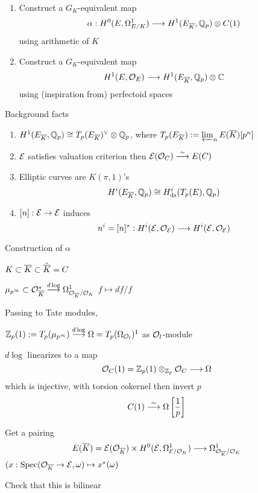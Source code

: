 \begin{enumerate}[1.]
\item Construct a $G_K$-equivalent map 
	\[
	\alpha: H^0(E, \Omega_{E/K}^1) \stackrel{}{\longrightarrow} H^1(E_{\overline{K}}, \mathbb{Q}_p) \otimes C(1)
	\]
using arithmetic of $K$

\item Construct a $G_K$-equivalent map
	\[
	H^1(E,\mathcal{O}_E) \stackrel{}{\longrightarrow} H^1(E_{\overline{K}}, \mathbb{Q}_p) \otimes \mathbb{C}
	\]
using (inspiration from) perfectoid spaces
\end{enumerate}


Background facts

\begin{enumerate}[1.]
\item $H^1(E_{\overline{K}}, \mathbb{Q}_p) \cong T_p(E_{\overline{K}})^\vee \otimes \mathbb{Q}_p$, where $T_p(E_{\overline{K}}):= \varprojlim_n E(\overline{K})[p^n]$

\item $\mathcal{E}$ satisfies valuation criterion then $\mathcal{E}(\mathcal{O}_C) \stackrel{\sim}{\longrightarrow} E(C)$

\item Elliptic curves are $K(\pi,1)$'s
	\[
	H^i(E_{\overline{K}}, \mathbb{Q}_p) \cong H^i_{\text{ds}}(T_p(E),\mathbb{Q}_p)
	\]

\item $[n]: \mathcal{E} \to \mathcal{E}$ induces
	\[
	n^i= [n]^*: H^i(\mathcal{E},\mathcal{O}_{\mathcal{E}}) \stackrel{}{\longrightarrow} H^i(\mathcal{E},\mathcal{O}_{\mathcal{E}})
	\]
\end{enumerate}


Construction of $\alpha$

$K \subset \overline{K} \subset \hat{\overline{K}}= C$

$\mu_{p^\infty} \subset \mathcal{O}_{\overline{K}}^* \stackrel{d \log}{\longrightarrow} \Omega_{\mathcal{O}_{\overline{K}}/\mathcal{O}_K}^1$ 
$f \mapsto df/f$

Passing to Tate modules,

$\mathbb{Z}_p(1):= T_p(\mu_{p^\infty}) \stackrel{d\log}{\longrightarrow} \Omega= T_p(\Omega_{\mathcal{O}_l})^1$ as $\mathcal{O}_l$-module


\begin{thm}[Fontaine]
$d\log$ linearizes to a map
	\[
	\mathcal{O}_C(1)= \mathbb{Z}_p(1) \otimes_{\mathbb{Z}_p} \mathcal{O}_C \stackrel{}{\longrightarrow} \Omega
	\]
which is injective, with torsion cokernel then invert $p$ 
	\[
	C(1) \stackrel{\sim}{\longrightarrow} \Omega \left[ \dfrac{1}{p} \right]
	\]
\end{thm}


Get a pairing
	\[
	E(\overline{K})= \mathcal{E}(\mathcal{O}_{\overline{K}}) \times H^0(\mathcal{E},\Omega_{\mathcal{E}/\mathcal{O}_K}^1) \stackrel{}{\longrightarrow} \Omega_{\mathcal{O}_{\overline{K}}/\mathcal{O}_K}^1
	\]
$(x: \operatorname{Spec}(\mathcal{O}_{\overline{K}} \to \mathcal{E}, \omega) \mapsto x^*(\omega)$


Check that this is bilinear

